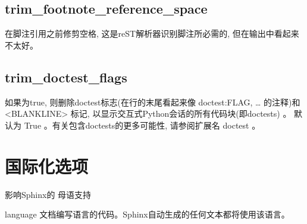 \documentclass[a4paper,10pt,english]{sphinxmanual}
\begin{document}
\subsection{trim\_footnote\_reference\_space}
\label{\detokenize{sphinx_conf:trim-footnote-reference-space}}
\sphinxAtStartPar
在脚注引用之前修剪空格, 这是reST解析器识别脚注所必需的, 但在输出中看起来不太好。


\subsection{trim\_doctest\_flags}
\label{\detokenize{sphinx_conf:trim-doctest-flags}}
\sphinxAtStartPar
如果为true, 则删除doctest标志(在行的末尾看起来像 doctest:FLAG, … 的注释)和 <BLANKLINE> 标记,
以显示交互式Python会话的所有代码块(即doctests) 。
默认为 True 。有关包含doctests的更多可能性, 请参阅扩展名 doctest 。


\section{国际化选项}
\label{\detokenize{sphinx_conf:id4}}
\sphinxAtStartPar
影响Sphinx的 母语支持

\sphinxAtStartPar
language
文档编写语言的代码。Sphinx自动生成的任何文本都将使用该语言。
\end{document}
